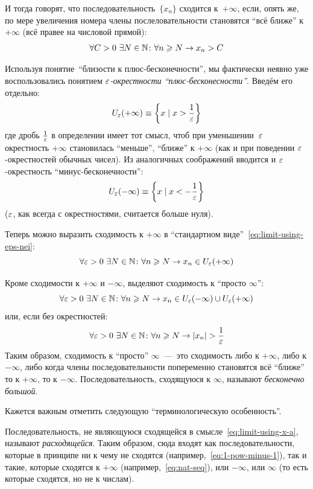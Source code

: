 \documentclass[a4paper,12pt]{article}
\begin{document}
  И тогда говорят, что последовательность~$\{x_n\}$ сходится к~${+}\infty$, если, опять же, по мере увеличения номера члены послеловательности становятся ``всё ближе'' к~${+}\infty$ (всё правее на числовой прямой):
  \[
    \forall C > 0\ \exists N \in \mathbb N\colon \forall n \geqslant N \to x_n > C
  \]

  Используя понятие~``близости к плюс-бесконечности'', мы фактически неявно уже воспользовались понятием \emph{$\varepsilon$-окрестности ``плюс-бесконесности''}.
  Введём его отдельно:
  \[
    U_{\varepsilon}({+}\infty) \equiv \left\{x \mid x > \frac{1}{\varepsilon}\right\}
  \]
  где дробь $\frac{1}{\varepsilon}$ в определении имеет тот смысл, чтоб при уменьшении~$\varepsilon$ окрестность ${+}\infty$ становилась ``меньше'', ``ближе'' к ${+}\infty$ (как и при поведении $\varepsilon$-окрестностей обычных чисел).
  Из аналогичных соображений вводится и $\varepsilon$-окрестность ``минус-бесконечности'':
  \[
    U_{\varepsilon}({-}\infty) \equiv \left\{x \mid x < -\frac{1}{\varepsilon}\right\}
  \]
  ($\varepsilon$, как всегда с окрестностями, считается больше нуля).

  Теперь можно выразить сходимость к ${+}\infty$ в ``стандартном виде''~\eqref{eq:limit-using-eps-nei}:
  \[
    \forall \varepsilon > 0\ \exists N \in \mathbb N\colon \forall n \geqslant N \to x_n \in U_{\varepsilon}({+}\infty)
  \]

  Кроме сходимости к $+\infty$ и $-\infty$, выделяют сходимость к ``просто $\infty$'':
  \[
    \forall \varepsilon > 0\ \exists N \in \mathbb N\colon \forall n \geqslant N \to x_n \in U_{\varepsilon}({-}\infty) \cup U_{\varepsilon}({+}\infty)
  \]
  или, если без окрестностей:
  \[
    \forall \varepsilon > 0\ \exists N \in \mathbb N\colon \forall n \geqslant N \to |x_n| > \frac{1}{\varepsilon}
  \]
  Таким образом, сходимость к ``просто'' $\infty$~---~это сходимость либо к $+\infty$, либо к $-\infty$, либо когда члены последовательности попеременно становятся всё ``ближе'' то к $+\infty$, то к $-\infty$.
  Последовательность, сходящуюся к $\infty$, называют \emph{бесконечно большой}.

  \begin{remark}
    Кажется важным отметить следующую ``терминологическую особенность''.
    
    Последовательность, не являющуюся сходящейся в смысле~\eqref{eq:limit-using-x-a}, называют \emph{расходящейся}.
    Таким образом, сюда входят как последовательности, которые в принципе ни к чему не сходятся (например,~\eqref{eq:1-pow-minus-1}), так и такие, которые сходятся к ${+}\infty$ (например,~\eqref{eq:nat-seq}), или ${-}\infty$, или $\infty$ (то есть которые сходятся, но не к числам).
  \end{remark}
\end{document}

